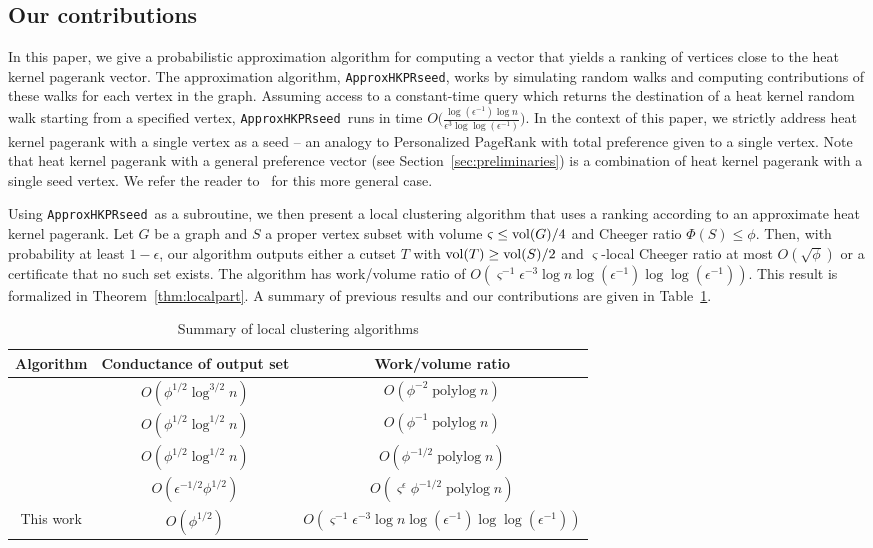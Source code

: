 \documentclass[runningheads,a4paper]{llncs}
\def\polylog{\operatorname{polylog}}
\newcommand{\vol}{\textmd{vol}}
\newcommand{\hkprseedalg}{\texttt{ApproxHKPRseed}}
\newcommand{\hkprcomplexity}{O\big(\frac{\log(\epsilon^{-1})\log n}{\epsilon^3\log\log(\epsilon^{-1})}\big)}
\begin{document}
\subsection{Our contributions}
In this paper, we give a probabilistic approximation algorithm for computing a
vector that yields a ranking of vertices close to the heat kernel pagerank
vector.  The approximation algorithm, \hkprseedalg, works by simulating random
walks and computing contributions of these walks for each vertex in the graph.
Assuming access to a constant-time query which returns the destination of a heat
kernel random walk starting from a specified vertex, \hkprseedalg~runs in time
$\hkprcomplexity$. In the context of this paper, we strictly address heat kernel
pagerank with a single vertex as a seed -- an analogy to Personalized PageRank
with total preference given to a single vertex.  Note that heat kernel pagerank
with a general preference vector (see Section~\ref{sec:preliminaries}) is a
combination of heat kernel pagerank with a single seed vertex.  We refer the
reader to~\cite{cs:imlinear:14} for this more general case.

Using \hkprseedalg~as a subroutine, we then present a local clustering algorithm
that uses a ranking according to an approximate heat kernel pagerank.  Let $G$
be a graph and $S$ a proper vertex subset with volume $\varsigma \leq \vol(G)/4$
and Cheeger ratio $\Phi(S) \leq \phi$.  Then, with probability at least
$1-\epsilon$, our algorithm outputs either a cutset $T$ with $\vol(T) \geq
\vol(S)/2$ and $\varsigma$-local Cheeger ratio at most $O(\sqrt{\phi})$ or a
certificate that no such set exists.  The algorithm has work/volume ratio of
$O(\varsigma^{-1}\epsilon^{-3}\log
n\log(\epsilon^{-1})\log\log(\epsilon^{-1}))$.  This result is formalized in
Theorem~\ref{thm:localpart}.  A summary of previous results and our
contributions are given in Table~\ref{table:resultssummary}.

\begin{table}
\centering
\begin{tabular}{c|c|c}\hline
Algorithm & Conductance of output set & Work/volume ratio\\\hline
\cite{st:localcluster:08} & $O(\phi^{1/2}\log^{3/2}n)$ & $O(\phi^{-2}\polylog n)$\\
\cite{acl:prgraphpartition:focs06} & $O(\phi^{1/2}\log^{1/2}n)$ & $O(\phi^{-1}\polylog n)$\\
\cite{ap:evolving:09} & $O(\phi^{1/2}\log^{1/2} n)$ & $O(\phi^{-1/2}\polylog n)$\\
\cite{gt:optimalcluster:12} & $O(\epsilon^{-1/2}\phi^{1/2})$ & $O(\varsigma^{\epsilon}\phi^{-1/2}\polylog n)$\\
This work & $O(\phi^{1/2})$ & $O(\varsigma^{-1}\epsilon^{-3}\log n\log(\epsilon^{-1})\log\log(\epsilon^{-1}))$\\\hline
\end{tabular}
\caption{Summary of local clustering algorithms}
\label{table:resultssummary}
\end{table}
\end{document}
